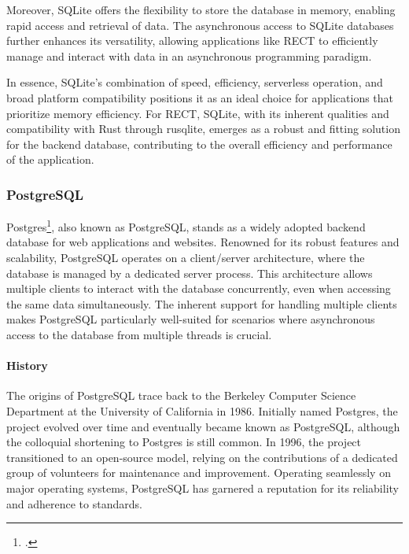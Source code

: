 Moreover, SQLite offers the flexibility to store the database in memory, enabling rapid access and retrieval of data. The asynchronous access to SQLite 
databases further enhances its versatility, allowing applications like RECT to efficiently manage and interact with data in an asynchronous programming paradigm.\newline

In essence, SQLite's combination of speed, efficiency, serverless operation, and broad platform compatibility positions it as an ideal choice for applications 
that prioritize memory efficiency. For RECT, SQLite, with its inherent qualities and compatibility with Rust through rusqlite, emerges as a robust and fitting 
solution for the backend database, contributing to the overall efficiency and performance of the application.

\subsubsection{PostgreSQL}
Postgres\footcite{postgres}, also known as PostgreSQL, stands as a widely adopted backend database for web applications and websites. Renowned for its robust 
features and scalability, PostgreSQL operates on a client/server architecture, where the database is managed by a dedicated server process. This architecture 
allows multiple clients to interact with the database concurrently, even when accessing the same data simultaneously. The inherent support for handling multiple 
clients makes PostgreSQL particularly well-suited for scenarios where asynchronous access to the database from multiple threads is crucial.\newline

\paragraph{History}
The origins of PostgreSQL trace back to the Berkeley Computer Science Department at the University of California in 1986. Initially named Postgres, the project 
evolved over time and eventually became known as PostgreSQL, although the colloquial shortening to Postgres is still common. In 1996, the project transitioned 
to an open-source model, relying on the contributions of a dedicated group of volunteers for maintenance and improvement. Operating seamlessly on major 
operating systems, PostgreSQL has garnered a reputation for its reliability and adherence to standards.\newline

